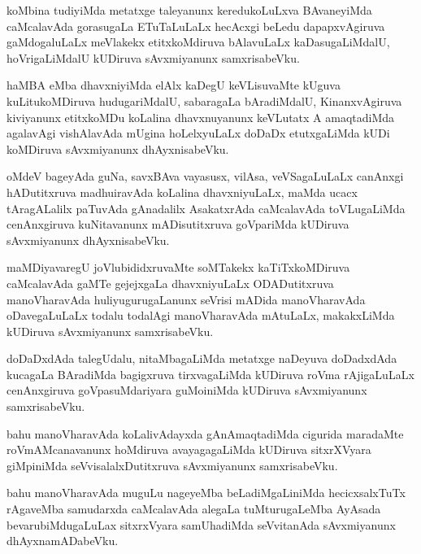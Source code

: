 \documentclass{article}
\begin{document}
\begin{mn}%
koMbina tudiyiMda metatxge taleyanunx keredukoLuLxva BAvaneyiMda caMcalavAda gorasugaLa 
ETuTaLuLaLx hecAcxgi beLedu dapapxvAgiruva gaMdogaluLaLx meVlakekx etitxkoMdiruva 
bAlavuLaLx kaDasugaLiMdalU, hoVrigaLiMdalU kUDiruva sAvxmiyanunx samxrisabeVku.
\end{mn}

\begin{mn}%
haMBA eMba dhavxniyiMda elAlx kaDegU keVLisuvaMte kUguva kuLitukoMDiruva hudugariMdalU, 
sabaragaLa bAradiMdalU, KinanxvAgiruva kiviyanunx etitxkoMDu koLalina dhavxnuyanunx 
keVLutatx A amaqtadiMda agalavAgi vishAlavAda mUgina hoLelxyuLaLx doDaDx etutxgaLiMda 
kUDi koMDiruva sAvxmiyanunx dhAyxnisabeVku.
\end{mn}

\begin{mn}%
oMdeV bageyAda guNa, savxBAva vayasusx, vilAsa, veVSagaLuLaLx canAnxgi hADutitxruva 
madhuiravAda koLalina dhavxniyuLaLx, maMda ucacx tAragALalilx paTuvAda gAnadalilx 
AsakatxrAda caMcalavAda toVLugaLiMda cenAnxgiruva kuNitavanunx mADisutitxruva goVpariMda 
kUDiruva sAvxmiyanunx dhAyxnisabeVku.
\end{mn}

\begin{mn}%
maMDiyavaregU joVlubididxruvaMte soMTakekx kaTiTxkoMDiruva caMcalavAda gaMTe gejejxgaLa 
dhavxniyuLaLx ODADutitxruva manoVharavAda huliyugurugaLanunx seVrisi mADida manoVharavAda 
oDavegaLuLaLx todalu todalAgi manoVharavAda mAtuLaLx, makakxLiMda kUDiruva sAvxmiyanunx 
samxrisabeVku.
\end{mn}

\begin{mn}%
doDaDxdAda talegUdalu, nitaMbagaLiMda metatxge naDeyuva doDadxdAda kucagaLa BAradiMda 
bagigxruva tirxvagaLiMda kUDiruva roVma rAjigaLuLaLx cenAnxgiruva goVpasuMdariyara 
guMoiniMda kUDiruva sAvxmiyanunx samxrisabeVku.
\end{mn}

\begin{mn}%
bahu manoVharavAda koLalivAdayxda gAnAmaqtadiMda cigurida maradaMte roVmAMcanavanunx 
hoMdiruva avayagagaLiMda kUDiruva sitxrXVyara giMpiniMda seVvisalalxDutitxruva 
sAvxmiyanunx samxrisabeVku.
\end{mn}

\begin{mn}%
bahu  manoVharavAda muguLu nageyeMba beLadiMgaLiniMda hecicxsalxTuTx rAgaveMba samudarxda 
caMcalavAda alegaLa tuMturugaLeMba AyAsada bevarubiMdugaLuLax sitxrxVyara samUhadiMda 
seVvitanAda sAvxmiyanunx dhAyxnamADabeVku.
\end{mn}
\end{document}
